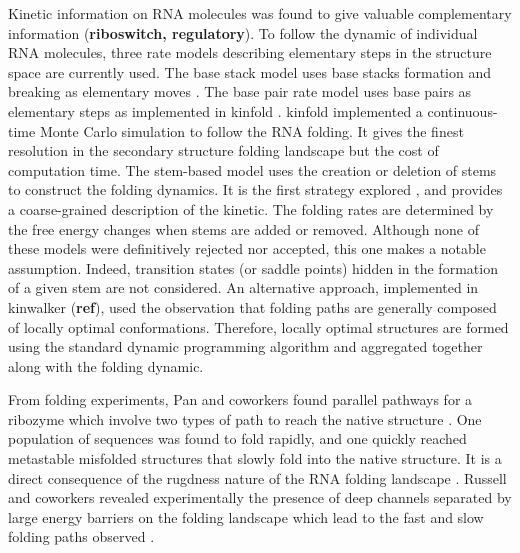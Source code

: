 \documentclass[a4paper,12pt]{article}
\begin{document}
Kinetic information on RNA molecules was found to give valuable complementary
information (\textbf{riboswitch, regulatory}). To follow the dynamic of individual RNA
molecules, three rate models describing elementary steps in the structure space
are currently used. The base stack model uses base stacks formation and breaking
as elementary moves . The base pair rate model uses base pairs as
elementary steps as implemented in kinfold
\cite{flamm00_rna_foldin_at_elemen_step_resol}. kinfold implemented a
continuous-time Monte Carlo simulation to follow the RNA folding. It gives the
finest resolution in the secondary structure folding landscape but the cost of
computation time. The stem-based model uses the creation or deletion of stems to
construct the folding dynamics. It is the first strategy explored
\cite{martinez84_rna_foldin_rule}, and provides a coarse-grained description of
the kinetic. The folding rates are determined by the free energy changes when
stems are added or removed. Although none of these models were definitively
rejected nor accepted, this one makes a notable assumption. Indeed, transition
states (or saddle points) hidden in the formation of a given stem are not
considered. An alternative approach, implemented in kinwalker (\textbf{ref}), used the
observation that folding paths are generally composed of locally optimal
conformations. Therefore, locally optimal structures are formed using the
standard dynamic programming algorithm and aggregated together along with the
folding dynamic.

From folding experiments, Pan and coworkers found parallel pathways for a
ribozyme which involve two types of path to reach the native structure
\cite{pan97_foldin_rna_invol_paral_pathw}. One population of sequences was found
to fold rapidly, and one quickly reached metastable misfolded structures that
slowly fold into the native structure. It is a direct consequence of the
rugdness nature of the RNA folding landscape
\cite{solomatin10_multip_nativ_states_reveal_persis}. Russell and coworkers
revealed experimentally the presence of deep channels separated by large energy
barriers on the folding landscape which lead to the fast and slow folding paths
observed \cite{russell01_explor_foldin_lands_struc_rna}.
\end{document}
